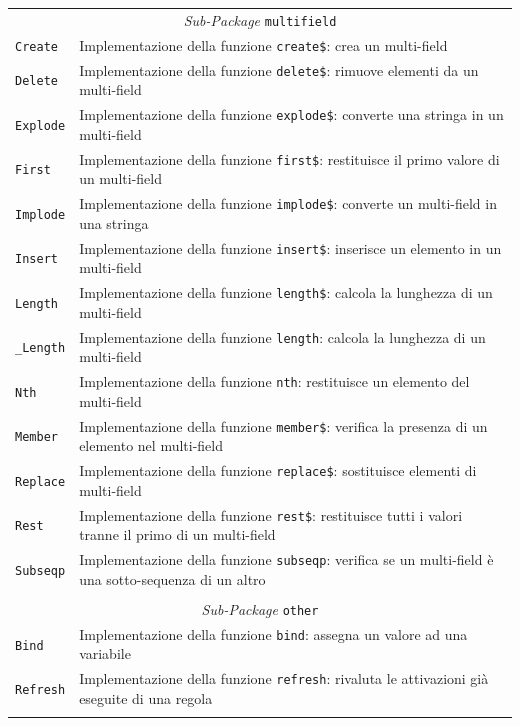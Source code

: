 \begin{longtable}{p{3.5cm}p{8.5cm}}
\multicolumn{2}{c}{\emph{Sub-Package} \texttt{multifield}}\\
	\hdashline[5pt/5pt]
		\texttt{Create} & Implementazione della funzione \texttt{create\$}: crea un multi-field\\ 
	\hdashline[1pt/5pt]
		\texttt{Delete} & Implementazione della funzione \texttt{delete\$}: rimuove elementi da un multi-field\\ 
	\hdashline[1pt/5pt]
		\texttt{Explode} & Implementazione della funzione \texttt{explode\$}: converte una stringa in un multi-field\\ 
	\hdashline[1pt/5pt]
		\texttt{First} & Implementazione della funzione \texttt{first\$}: restituisce il primo valore di un multi-field\\ 
	\hdashline[1pt/5pt]
		\texttt{Implode} & Implementazione della funzione \texttt{implode\$}: converte un multi-field in una stringa\\
	\hdashline[1pt/5pt]
		\texttt{Insert} & Implementazione della funzione \texttt{insert\$}: inserisce un elemento in un multi-field\\ 
	\hdashline[1pt/5pt]
		\texttt{Length} & Implementazione della funzione \texttt{length\$}: calcola la lunghezza di un multi-field\\
	\hdashline[1pt/5pt]
		\texttt{\_Length} & Implementazione della funzione \texttt{length}: calcola la lunghezza di un multi-field\\
	\hdashline[1pt/5pt]
		\texttt{Nth} & Implementazione della funzione \texttt{nth}: restituisce un elemento del multi-field\\
	\hdashline[1pt/5pt]
		\texttt{Member} & Implementazione della funzione \texttt{member\$}: verifica la presenza di un elemento nel multi-field\\
	\hdashline[1pt/5pt]
		\texttt{Replace} & Implementazione della funzione \texttt{replace\$}: sostituisce elementi di multi-field\\
	\hdashline[1pt/5pt]
		\texttt{Rest} & Implementazione della funzione \texttt{rest\$}: restituisce tutti i valori tranne il primo di un multi-field\\
	\hdashline[1pt/5pt]
		\texttt{Subseqp} & Implementazione della funzione \texttt{subseqp}: verifica se  un multi-field è una sotto-sequenza di un altro\\
	\hline\\
	
\multicolumn{2}{c}{\emph{Sub-Package} \texttt{other}}\\
	\hdashline[5pt/5pt]
		\texttt{Bind} & Implementazione della funzione \texttt{bind}: assegna un valore ad una variabile\\ 
	\hdashline[1pt/5pt]
		\texttt{Refresh} & Implementazione della funzione \texttt{refresh}: rivaluta le attivazioni già eseguite di una regola\\ 
	\hline\\
	

\end{longtable}
